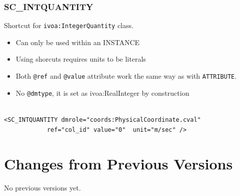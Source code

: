 \documentclass[11pt,a4paper]{ivoa}
\begin{document}
\subsubsection{SC\_INTQUANTITY}
Shortcut for \texttt{ivoa:IntegerQuantity} class.

\begin{itemize}
    \item Can only be used within an INSTANCE        
    \item Using shorcuts requires units to be literals    
    \item Both \texttt{@ref} and \texttt{@value} attribute work the same way as with \texttt{ATTRIBUTE}.
    \item No \texttt{@dmtype},  it is set as ivoa:RealInteger by construction
 \end{itemize}


\begin{lstlisting}[caption={\texttt{ivoa:IntegerQuantity} example},style=XML,basicstyle=\small]

<SC_INTQUANTITY dmrole="coords:PhysicalCoordinate.cval"
            ref="col_id" value="0"  unit="m/sec" />
\end{lstlisting}


\appendix

\section{Changes from Previous Versions}

No previous versions yet.  



\end{document}
